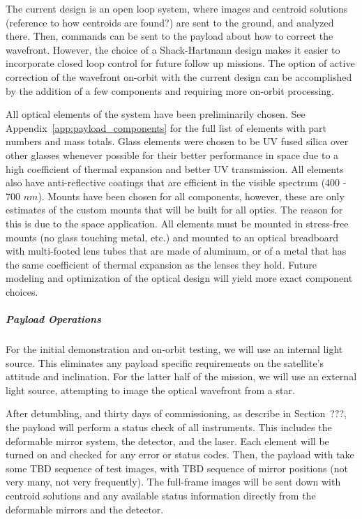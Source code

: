 \documentclass[12pt]{article}
\begin{document}
The current design is an open loop system, where images and centroid solutions (reference to how centroids are found?) are sent to the ground, and analyzed there. Then, commands can be sent to the payload about how to correct the wavefront. However, the choice of a Shack-Hartmann design makes it easier to incorporate closed loop control for future follow up missions. The option of active correction of the wavefront on-orbit with the current design can be accomplished by the addition of a few components and requiring more on-orbit processing.

All optical elements of the system have been preliminarily chosen.  See Appendix~\ref{app:payload_components} for the full list of elements with part numbers and mass totals.  Glass elements were chosen to be UV fused silica over other glasses whenever possible for their better performance in space \cite{radiation_optics} due to a high coefficient of thermal expansion and better UV transmission.  All elements also have anti-reflective coatings that are efficient in the visible spectrum (400 - 700 $nm$).  Mounts have been chosen for all components, however, these are only estimates of the custom mounts that will be built for all optics.  The reason for this is due to the space application.  All elements must be mounted in stress-free mounts (no glass touching metal, etc.) and mounted to an optical breadboard with multi-footed lens tubes that are made of aluminum, or of a metal that has the same coefficient of thermal expansion as the lenses they hold.  Future modeling and optimization of the optical design will yield more exact component choices.

\subparagraph{Payload Operations}
For the initial demonstration and on-orbit testing, we will use an internal light source. This eliminates any payload specific requirements on the satellite's attitude and inclination. For the latter half of the mission, we will use an external light source, attempting to image the optical wavefront from a star.

After detumbling, and thirty days of commissioning, as describe in Section~???, the payload will perform a status check of all instruments. This includes the deformable mirror system, the detector, and the laser. Each element will be turned on and checked for any error or status codes. Then, the payload with take some TBD sequence of test images, with TBD sequence of mirror positions (not very many, not very frequently). The full-frame images will be sent down with centroid solutions and any available status information directly from the deformable mirrors and the detector.
\end{document}
